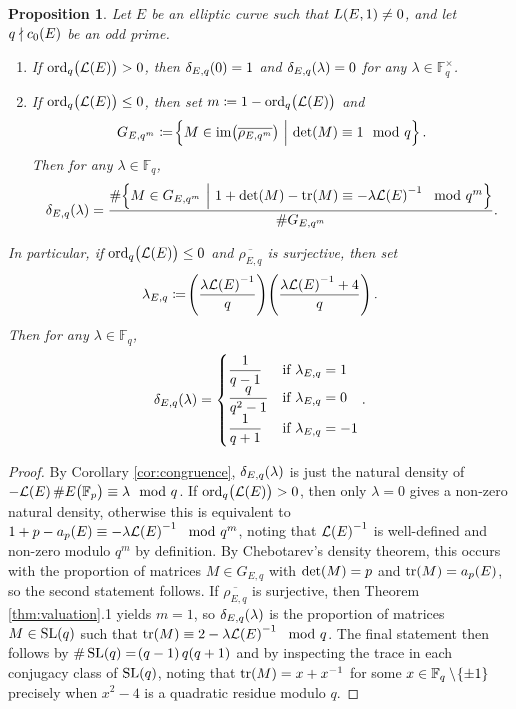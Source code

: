 \documentclass{article}
\theoremstyle{plain}
\newtheorem{proposition}[n]{Proposition}
\theoremstyle{definition}
\newcommand{\FF}{\mathbb{F}}
\newcommand{\im}{\operatorname{im}}
\newcommand{\LLL}{\mathcal{L}}
\newcommand{\ord}{\operatorname{ord}}
\newcommand{\SL}{\operatorname{SL}}
\newcommand{\tr}{\operatorname{tr}}
\newcommand{\br}{\!\del}
\newcommand{\st}{\ \middle| \ }
\begin{document}
\begin{proposition}
\label{prop:density}
Let $ E $ be an elliptic curve such that $ L\br{E, 1} \ne 0 $, and let $ q \nmid c_0\br{E} $ be an odd prime.
\begin{enumerate}
\item If $ \ord_q\br{\LLL\br{E}} > 0 $, then $ \delta_{E, q}\br{0} = 1 $ and $ \delta_{E, q}\br{\lambda} = 0 $ for any $ \lambda \in \FF_q^\times $.
\item If $ \ord_q\br{\LLL\br{E}} \le 0 $, then set $ m \coloneqq 1 - \ord_q\br{\LLL\br{E}} $ and
$$ G_{E, q^m} \coloneqq \cbr{M \in \im\br{\overline{\rho_{E, q^m}}} \st \det\br{M} \equiv 1 \mod q}. $$
Then for any $ \lambda \in \FF_q $,
$$ \delta_{E, q}\br{\lambda} = \dfrac{\#\cbr{M \in G_{E, q^m} \st 1 + \det\br{M} - \tr\br{M} \equiv -\lambda\LLL\br{E}^{-1} \mod q^m}}{\#G_{E, q^m}}. $$
\end{enumerate}
In particular, if $ \ord_q\br{\LLL\br{E}} \le 0 $ and $ \overline{\rho_{E, q}} $ is surjective, then set
$$ \lambda_{E, q} \coloneqq \br{\dfrac{\lambda\LLL\br{E}^{-1}}{q}}\br{\dfrac{\lambda\LLL\br{E}^{-1} + 4}{q}}. $$
Then for any $ \lambda \in \FF_q $,
$$ \delta_{E, q}\br{\lambda} =
\begin{cases}
\dfrac{1}{q - 1} & \text{if} \ \lambda_{E, q} = 1 \\
\dfrac{q}{q^2 - 1} & \text{if} \ \lambda_{E, q} = 0 \\
\dfrac{1}{q + 1} & \text{if} \ \lambda_{E, q} = -1
\end{cases}.
$$
\end{proposition}

\begin{proof}
By Corollary \ref{cor:congruence}, $ \delta_{E, q}\br{\lambda} $ is just the natural density of $ -\LLL\br{E}\#E\br{\FF_p} \equiv \lambda \mod q $. If $ \ord_q\br{\LLL\br{E}} > 0 $, then only $ \lambda = 0 $ gives a non-zero natural density, otherwise this is equivalent to $ 1 + p - a_p\br{E} \equiv -\lambda\LLL\br{E}^{-1} \mod q^m $, noting that $ \LLL\br{E}^{-1} $ is well-defined and non-zero modulo $ q^m $ by definition. By Chebotarev's density theorem, this occurs with the proportion of matrices $ M \in G_{E, q} $ with $ \det\br{M} = p $ and $ \tr\br{M} = a_p\br{E} $, so the second statement follows. If $ \overline{\rho_{E, q}} $ is surjective, then Theorem \ref{thm:valuation}.1 yields $ m = 1 $, so $ \delta_{E, q}\br{\lambda} $ is the proportion of matrices $ M \in \SL\br{q} $ such that $ \tr\br{M} \equiv 2 - \lambda\LLL\br{E}^{-1} \mod q $. The final statement then follows by $ \#\SL\br{q} = \br{q - 1}q\br{q + 1} $ and by inspecting the trace in each conjugacy class of $ \SL\br{q} $, noting that $ \tr\br{M} = x + x^{-1} $ for some $ x \in \FF_q \setminus \cbr{\pm1} $ precisely when $ x^2 - 4 $ is a quadratic residue modulo $ q $.
\end{proof}
\end{document}

